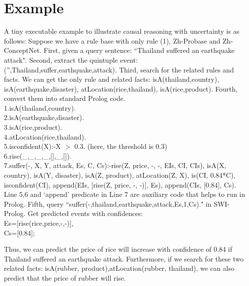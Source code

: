 \section{Example}
\label{sec:example}
A tiny executable example to illustrate causal reasoning with uncertainty is as follows:
Suppose we have a rule base with only rule (1), Zh-Probase and Zh-ConceptNet.
First, given a query sentence: ``Thailand suffered an earthquake attack".
Second, extract the quintuple event: ('',Thailand,suffer,earthquake,attack).
Third, search for the related rules and facts. We can get the only rule and related facts: isA(thailand,country), isA(earthquake,disaster), atLocation(rice,thailand), isA(rice,product).
Fourth, convert them into standard Prolog code.\\
1.isA(thailand,country).\\
2.isA(earthquake,disaster).\\
3.isA(rice,product).\\
4.atLocation(rice,thailand).\\
5.isconfident(X):-X $>$ 0.3. (here, the threshold is 0.3)\\
6.rise(\_,\_,\_,\_,[],\_,[]).\\
7.suffer(-, X, Y, attack, Es, C, Cs):-rise(Z, price, -, -, EIs, CI, CIs), isA(X, country), isA(Y, disaster), isA(Z, product), atLocation(Z, X), is(CI, 0.84*C), isconfident(CI), append(EIs, [rise(Z, price, -, -)], Es), append(CIs, [0.84], Cs).\\
Line 5,6 and `append' predicate in Line 7 are auxiliary code that helps to run in Prolog.
Fifth, query ``suffer(-,thailand,earthquake,attack,Es,1,Cs)." in SWI-Prolog.
Get predicted events with confidences:\\
Es=[rise(rice,price,-,-)],\\
Cs=[0.84];

Thus, we can predict the price of rice will increase with confidence of 0.84 if Thailand suffered an earthquake attack.
Furthermore, if we search for these two related facts: isA(rubber, product),atLocation(rubber, thailand), we can also predict that the price of rubber will rise.



